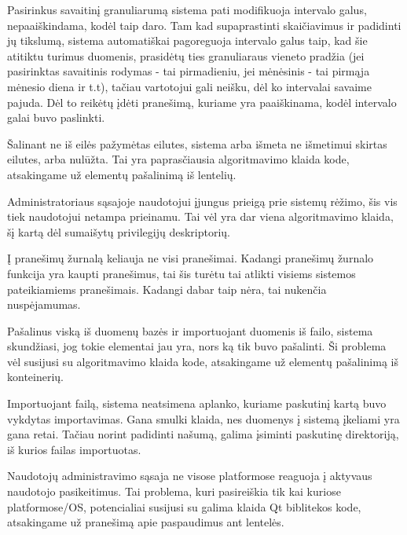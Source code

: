 {
  Pasirinkus savaitinį granuliarumą sistema pati modifikuoja intervalo galus,
  nepaaiškindama, kodėl taip daro.
}
{
  Tam kad supaprastinti skaičiavimus ir padidinti jų tikslumą, sistema automatiškai
  pagoreguoja intervalo galus taip, kad šie atitiktu turimus duomenis, prasidėtų ties 
  granuliaraus vieneto pradžia (jei pasirinktas savaitinis rodymas - tai pirmadieniu,
  jei mėnėsinis - tai pirmąja mėnesio diena ir t.t), tačiau vartotojui gali neišku, dėl
  ko intervalai savaime pajuda. Dėl to reikėtų įdėti pranešimą, kuriame yra paaiškinama,
  kodėl intervalo galai buvo paslinkti.
}

{
  Šalinant ne iš eilės pažymėtas eilutes, sistema arba išmeta ne išmetimui
  skirtas eilutes, arba nulūžta.
}
{
  Tai yra paprasčiausia algoritmavimo klaida kode, atsakingame už elementų pašalinimą
  iš lentelių.
}

{
  Administratoriaus sąsajoje naudotojui įjungus prieigą prie sistemų
  rėžimo, šis vis tiek naudotojui netampa prieinamu.
}
{
  Tai vėl yra dar viena algoritmavimo klaida, šį kartą dėl sumaišytų privilegijų deskriptorių.
}

{
  Į pranešimų žurnalą keliauja ne visi pranešimai.
}
{
  Kadangi pranešimų žurnalo funkcija yra kaupti pranešimus, tai šis turėtu tai atlikti
  visiems sistemos pateikiamiems pranešimais. Kadangi dabar taip nėra, tai nukenčia
  nuspėjamumas.
}

{
  Pašalinus viską iš duomenų bazės ir importuojant duomenis iš failo,
  sistema skundžiasi, jog tokie elementai jau yra, nors ką tik buvo pašalinti.
}
{
  Ši problema vėl susijusi su algoritmavimo klaida kode, atsakingame už elementų pašalinimą
  iš konteinerių.
}

{
  Importuojant failą, sistema neatsimena aplanko, kuriame paskutinį
  kartą buvo vykdytas importavimas.
}
{
  Gana smulki klaida, nes duomenys į sistemą įkeliami yra gana retai. Tačiau norint
  padidinti našumą, galima įsiminti paskutinę direktoriją, iš kurios failas importuotas.
}

{
  Naudotojų administravimo sąsaja ne visose platformose reaguoja į
  aktyvaus naudotojo pasikeitimus.
}
{
  Tai problema, kuri pasireiškia tik kai kuriose platformose/OS, potencialiai susijusi
  su galima klaida Qt biblitekos kode, atsakingame už pranešimą apie paspaudimus ant 
  lentelės.
}

